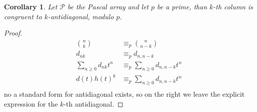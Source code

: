 \documentclass[11pt,a4paper]{article} %
\newtheorem{corollary}[theorem]{Corollary}
\begin{document}
    \begin{corollary}
    Let $\mathcal{P}$ be the Pascal array and let $p$ be a prime, than $k$-th column 
    is congruent to $k$-antidiagonal, modulo $p$.
    \end{corollary}
    \begin{proof}
        \begin{displaymath}
            \begin{split}
                { {n} \choose {k} } &\equiv_{p} { {n} \choose {n-k} } \\
                d_{nk} &\equiv_{p} d_{n,n-k}\\
                \sum_{n\geq 0}{d_{nk} t^n} &\equiv_{p}\sum_{n\geq 0}{d_{n,n-k} t^n} \\
                d(t)h(t)^k &\equiv_{p}\sum_{n\geq 0}{d_{n,n-k} t^n} \\
            \end{split}
        \end{displaymath}
    no a standard form for antidiagonal exists, so on the right we leave the explicit
    expression for the $k$-th antidiagonal.
    \end{proof}
\end{document}

